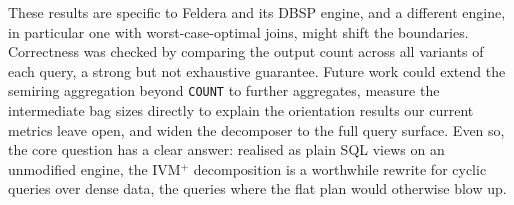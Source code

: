 These results are specific to Feldera and its DBSP engine, and a different engine, in particular one with worst-case-optimal joins, might shift the boundaries. Correctness was checked by comparing the output count across all variants of each query, a strong but not exhaustive guarantee. Future work could extend the semiring aggregation beyond \texttt{COUNT} to further aggregates, measure the intermediate bag sizes directly to explain the orientation results our current metrics leave open, and widen the decomposer to the full query surface. Even so, the core question has a clear answer: realised as plain SQL views on an unmodified engine, the IVM$^+$ decomposition is a worthwhile rewrite for cyclic queries over dense data, the queries where the flat plan would otherwise blow up.
